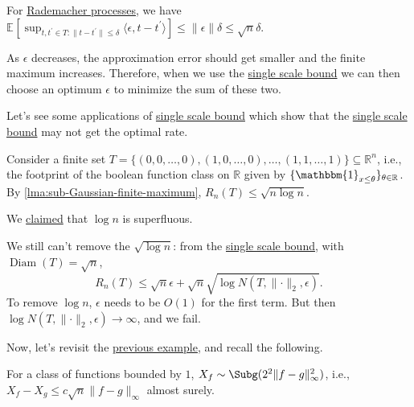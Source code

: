 \begin{eg}
	For \hyperref[eg:Rademacher-process]{Rademacher processes}, we have \(\mathbb{E}_{}\left[\sup _{t, t^{\prime} \in T \colon \lVert t - t^{\prime} \rVert \leq \delta } \langle \epsilon , t - t^{\prime}  \rangle  \right] \leq \lVert \epsilon \rVert \delta \leq \sqrt{n} \delta \).
\end{eg}

\begin{remark}
	As \(\epsilon \) decreases, the approximation error should get smaller and the finite maximum increases. Therefore, when we use the \hyperref[lma:single-scale-bound]{single scale bound} we can then choose an optimum \(\epsilon \) to minimize the sum of these two.
\end{remark}

Let's see some applications of \hyperref[lma:single-scale-bound]{single scale bound} which show that the \hyperref[lma:single-scale-bound]{single scale bound} may not get the optimal rate.

\begin{eg}
	Consider a finite set \(T = \{ (0, 0, \dots , 0), (1, 0, \dots , 0), \dots , (1, 1, \dots , 1) \} \subseteq \mathbb{R} ^n\), i.e., the footprint of the boolean function class on \(\mathbb{R} \) given by \(\{ \mathbbm{1}_{x \leq \theta } \}_{\theta \in \mathbb{R}} \). By \autoref{lma:sub-Gaussian-finite-maximum}, \(R_n(T) \leq \sqrt{n \log n}\).

	\begin{prev}
		We \hyperref[rmk:log-n-superfluous]{claimed} that \(\log n\) is superfluous.
	\end{prev}

	We still can't remove the \(\sqrt{\log n}\): from the \hyperref[lma:single-scale-bound]{single scale bound}, with \(\mathop{\mathrm{Diam}}(T) = \sqrt{n} \),
	\[
		R_n(T) \leq \sqrt{n} \epsilon + \sqrt{n} \sqrt{\log N(T, \lVert \cdot \rVert _2, \epsilon )}.
	\]
	To remove \(\log n\), \(\epsilon\) needs to be \(O(1)\) for the first term. But then \(\log N(T, \lVert \cdot \rVert _2, \epsilon ) \to \infty \), and we fail.
\end{eg}

Now, let's revisit the \hyperref[eg:supremum-of-empirical-process]{previous example}, and recall the following.

\begin{prev}
	For a class of functions bounded by \(1\), \(X_f \sim \Subg(2^2 \lVert f-g \rVert _\infty ^2)\), i.e., \(X_f - X_g \leq c \sqrt{n} \lVert f - g \rVert _\infty \) almost surely.
\end{prev}

